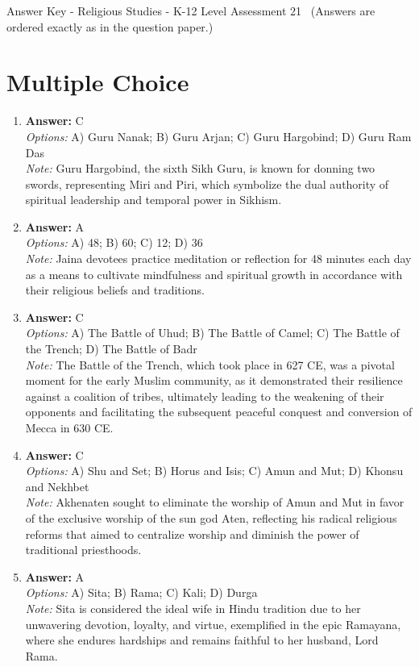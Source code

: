 \documentclass[12pt]{article}
\begin{document}
\begin{center}
Answer Key - Religious Studies - K-12 Level Assessment 21 \
\small (Answers are ordered exactly as in the question paper.)
\end{center}

\section*{Multiple Choice}
\begin{enumerate}[label=\arabic*.]
\item \textbf{Answer:} C
\\ \textit{Options:} A) Guru Nanak; B) Guru Arjan; C) Guru Hargobind; D) Guru Ram Das
\\ \textit{Note:} Guru Hargobind, the sixth Sikh Guru, is known for donning two swords, representing Miri and Piri, which symbolize the dual authority of spiritual leadership and temporal power in Sikhism.
\item \textbf{Answer:} A
\\ \textit{Options:} A) 48; B) 60; C) 12; D) 36
\\ \textit{Note:} Jaina devotees practice meditation or reflection for 48 minutes each day as a means to cultivate mindfulness and spiritual growth in accordance with their religious beliefs and traditions.
\item \textbf{Answer:} C
\\ \textit{Options:} A) The Battle of Uhud; B) The Battle of Camel; C) The Battle of the Trench; D) The Battle of Badr
\\ \textit{Note:} The Battle of the Trench, which took place in 627 CE, was a pivotal moment for the early Muslim community, as it demonstrated their resilience against a coalition of tribes, ultimately leading to the weakening of their opponents and facilitating the subsequent peaceful conquest and conversion of Mecca in 630 CE.
\item \textbf{Answer:} C
\\ \textit{Options:} A) Shu and Set; B) Horus and Isis; C) Amun and Mut; D) Khonsu and Nekhbet
\\ \textit{Note:} Akhenaten sought to eliminate the worship of Amun and Mut in favor of the exclusive worship of the sun god Aten, reflecting his radical religious reforms that aimed to centralize worship and diminish the power of traditional priesthoods.
\item \textbf{Answer:} A
\\ \textit{Options:} A) Sita; B) Rama; C) Kali; D) Durga
\\ \textit{Note:} Sita is considered the ideal wife in Hindu tradition due to her unwavering devotion, loyalty, and virtue, exemplified in the epic Ramayana, where she endures hardships and remains faithful to her husband, Lord Rama.
\end{enumerate}
\end{document}
